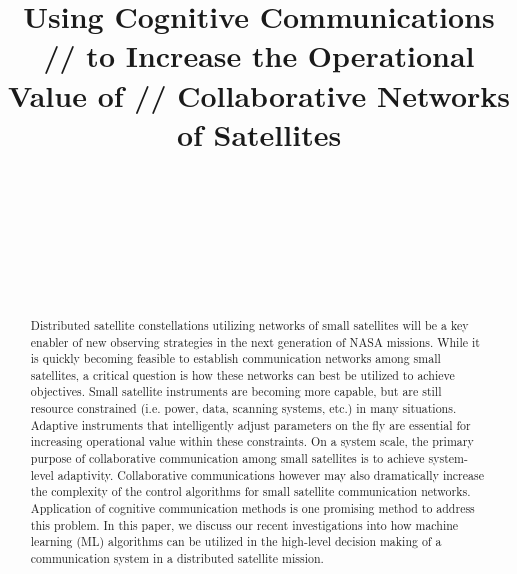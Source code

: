 \documentclass[conference]{IEEEtran}
\title{Using Cognitive Communications // to Increase the Operational Value of //
  Collaborative Networks of Satellites}
\author{
  \IEEEauthorblockN{Ryan B. Linnabary}
  \IEEEauthorblockA{\thisplace linnabary.24@osu.edu}
  \and
  \IEEEauthorblockN{Andrew J. O'Brien}
  \IEEEauthorblockA{\thisplace obrien.200@osu.edu}
  \and
  \IEEEauthorblockN{Graeme E. Smith}
  \IEEEauthorblockA{\thisplace smith.8347@osu.edu}
  \and
  \IEEEauthorblockN{Christopher Ball}
  \IEEEauthorblockA{\thisplace ball.51@osu.edu}
  \and {~} \and {~~~~~~~~~~~~~~~~~~~~~~~~~~~} \and
  \IEEEauthorblockN{Joel T. Johnson}
  \IEEEauthorblockA{\thisplace johnson.1374@osu.edu}
  \and {~~~~~~~~~~~~~~~~~~~~~~~} \and {~~~~~~~~~~~~~~~~~~~~~~}
}
\begin{document}
\maketitle



\begin{abstract}

  Distributed satellite constellations utilizing networks of small satellites
will be a key enabler of new observing strategies in the next generation of NASA
missions.  While it is quickly becoming feasible to establish communication
networks among small satellites, a critical question is how these networks can
best be utilized to achieve objectives.  Small satellite instruments are
becoming more capable, but are still resource constrained (i.e. power,
data, scanning systems, etc.) in many situations.  Adaptive instruments that intelligently adjust
parameters {\color{black} on the fly} are essential for increasing operational
value within these constraints. On a system scale, the primary purpose of collaborative
communication among small satellites is to achieve system-level adaptivity.
Collaborative communications however may also dramatically increase the complexity of the control algorithms for
small satellite communication networks.  Application of cognitive communication methods
is one promising method to address this problem.  In this paper, we discuss our
recent investigations into how machine learning (ML) algorithms can be utilized
in the high-level decision making of a communication system in a distributed
satellite mission.

\end{abstract}
\end{document}
